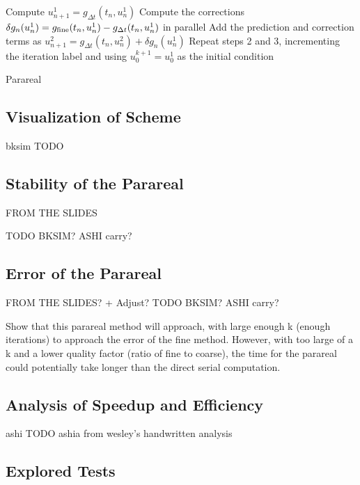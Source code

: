 \documentclass[letterpaper,twocolumn,11pt]{article}
\begin{document}
\begin{algorithm}[t]
    Compute $u^1_{n+1} = g_{\Delta t}(t_n, u^1_n)$\;
    Compute the corrections $\delta g_n(u^1_n) = g_{\textnormal{fine}}(t_n,
    u^1_n) - g_{\Delta t}(t_n, u^1_n)$ in parallel\;
    Add the prediction and correction terms as $u^2_{n+1} = g_{\Delta t}(t_n,
    u^2_n) + \delta g_n(u^1_n)$\;
    Repeat steps 2 and 3, incrementing the iteration label and using $u^{k+1}_0
    = u^1_0$ as the initial condition\;
 \caption{Parareal}
 \label{alg:parareal}
\end{algorithm}

\subsection{Visualization of Scheme}

bksim TODO

\subsection{Stability of the Parareal}

FROM THE SLIDES 

TODO BKSIM? ASHI carry?

\subsection{Error of the Parareal}

FROM THE SLIDES? + Adjust?
TODO BKSIM? ASHI carry?

Show that this parareal method will approach, with large enough k (enough iterations) to approach the error of the fine method.  However, with too large of a k and a lower quality factor (ratio of fine to coarse), the time for the parareal could potentially take longer than the direct serial computation.

\subsection{Analysis of Speedup and Efficiency}

ashi TODO ashia from wesley's handwritten analysis

\subsection{Explored Tests}
\end{document}
